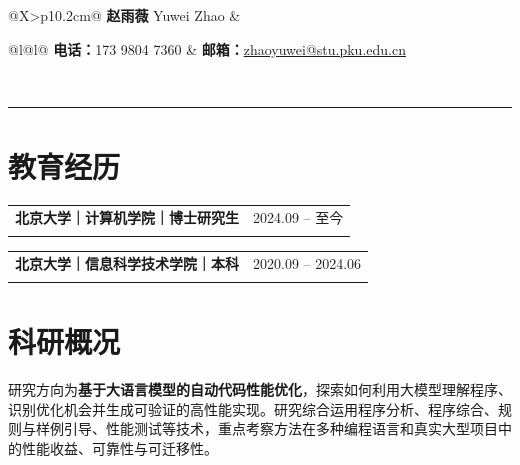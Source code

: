 \documentclass[10pt,a4paper,fontset=none]{ctexart}
\makeatletter
\newcommand{\datedentry}[3]{%
  \begin{tabularx}{\textwidth}{@{}>{\bfseries}X>{\raggedleft\arraybackslash}p{3.2cm}@{}}
    #1 & \textcolor{muted}{#2}\\[-1pt]
    \multicolumn{2}{@{}l@{}}{\textcolor{muted}{#3}}
  \end{tabularx}
}
\makeatother
\begin{document}
\begin{tabularx}{\textwidth}{@{}X>{\raggedleft\arraybackslash}p{10.2cm}@{}}
  {\fontsize{25}{28}\selectfont\bfseries 赵雨薇}\quad
  {\large\color{muted}Yuwei Zhao}
  & {\small
      \begin{tabular}{@{}l@{\hspace{1.1em}}l@{}}
        \textbf{电话：}173 9804 7360 &
        \textbf{邮箱：}\href{mailto:zhaoyuwei@stu.pku.edu.cn}{zhaoyuwei@stu.pku.edu.cn}\\[-1pt]
      \end{tabular}
    }\\
\end{tabularx}

\vspace{4pt}
{\color{msblue}\rule{\textwidth}{1.35pt}}\par

\section{教育经历}
\datedentry{北京大学｜计算机学院｜博士研究生}{2024.09 -- 至今}{导师：熊英飞教授}
\vspace{3pt}
\datedentry{北京大学｜信息科学技术学院｜本科}{2020.09 -- 2024.06}{专业：信息与计算科学｜毕业论文：基于抽象解释的动态规划算法自动合成}
\vspace{-10pt}

\section{科研概况}
研究方向为\textbf{基于大语言模型的自动代码性能优化}，探索如何利用大模型理解程序、识别优化机会并生成可验证的高性能实现。研究综合运用程序分析、程序综合、规则与样例引导、性能测试等技术，重点考察方法在多种编程语言和真实大型项目中的性能收益、可靠性与可迁移性。
\end{document}
